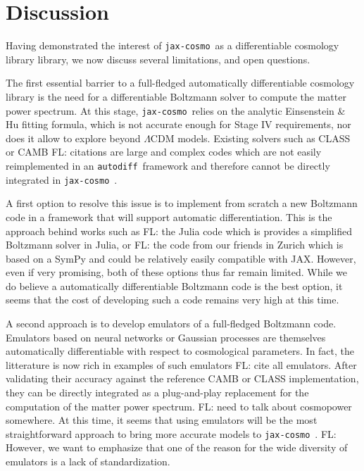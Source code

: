 \documentclass[twocolumn,twocolappendix,nofootinbib,iop]{openjournal}
\newcommand{\FrL}[1]{{\color{cyan}FL: #1}}
\newcommand{\jaxcosmo}{\texttt{jax-cosmo}}
\newcommand{\autodiff}{\texttt{autodiff}}
\begin{document}
\section{Discussion}
\label{sec-discussion}

Having demonstrated the interest of \jaxcosmo\ as a differentiable cosmology library library, we now discuss several limitations, and open questions.

The first essential barrier to a full-fledged automatically differentiable cosmology library is the need for a differentiable Boltzmann solver to compute the matter power spectrum. At this stage, \jaxcosmo\ relies on the analytic Einsenstein \& Hu fitting formula, which is not accurate enough for Stage IV requirements, nor does it allow to explore beyond $\Lambda$CDM models. Existing solvers such as CLASS or CAMB \FrL{citations} are large and complex codes which are not easily reimplemented in an \autodiff\ framework and therefore cannot be directly integrated in \jaxcosmo\ . 

A first option to resolve this issue is to implement from scratch a new Boltzmann code in a framework that will support automatic differentiation. This is the approach behind works such as \FrL{the Julia code} which is provides a simplified Boltzmann solver in Julia, or \FrL{the code from our friends in Zurich} which is based on a SymPy and could be relatively easily compatible with JAX. However, even if very promising, both of these options thus far remain limited. While we do believe a automatically differentiable Boltzmann code is the best option, it seems that the cost of developing such a code remains very high at this time.

A second approach is to develop emulators of a full-fledged Boltzmann code. Emulators based on neural networks or Gaussian processes are themselves automatically differentiable with respect to cosmological parameters. In fact, the litterature is now rich in examples of such emulators \FrL{cite all emulators}. After validating their accuracy against the reference CAMB or CLASS implementation, they can be directly integrated as a plug-and-play replacement for the computation of the matter power spectrum. \FrL{need to talk about cosmopower somewhere.} At this time, it seems that using emulators will be the most straightforward approach to bring more accurate models to \jaxcosmo\ . \FrL{However, we want to emphasize that one of the reason for the wide diversity of emulators is a lack of standardization}.
\end{document}
